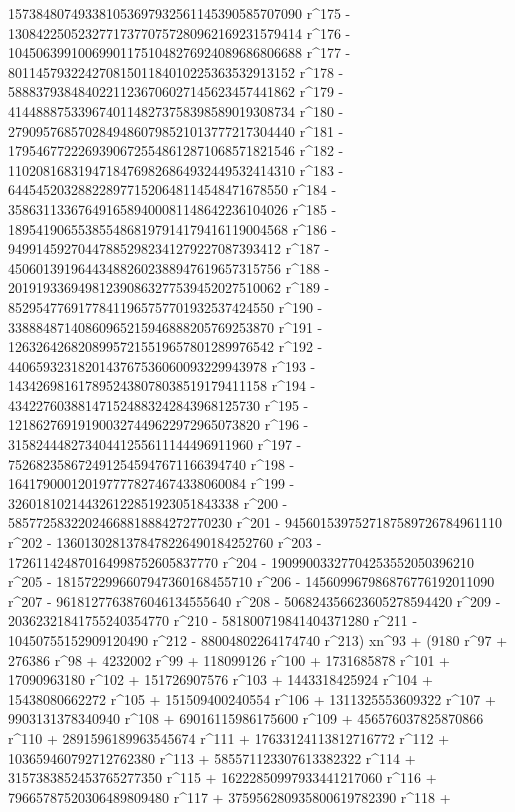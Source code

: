        157384807493381053697932561145390585707090 r^175 - 
       130842250523277173770757280962169231579414 r^176 - 
       104506399100699011751048276924089686806688 r^177 - 
       80114579322427081501184010225363532913152 r^178 - 
       58883793848402211236706027145623457441862 r^179 - 
       41448887533967401148273758398589019308734 r^180 - 
       27909576857028494860798521013777217304440 r^181 - 
       17954677222693906725548612871068571821546 r^182 - 
       11020816831947184769826864932449532414310 r^183 - 
       6445452032882289771520648114548471678550 r^184 - 
       3586311336764916589400081148642236104026 r^185 - 
       1895419065538554868197914179416119004568 r^186 - 
       949914592704478852982341279227087393412 r^187 - 
       450601391964434882602388947619657315756 r^188 - 
       201919336949812390863277539452027510062 r^189 - 
       85295477691778411965757701932537424550 r^190 - 
       33888487140860965215946888205769253870 r^191 - 
       12632642682089957215519657801289976542 r^192 - 
       4406593231820143767536060093229943978 r^193 - 
       1434269816178952438078038519179411158 r^194 - 
       434227603881471524883242843968125730 r^195 - 
       121862769191900327449622972965073820 r^196 - 
       31582444827340441255611144496911960 r^197 - 
       7526823586724912545947671166394740 r^198 - 
       1641790001201977778274674338060084 r^199 - 
       326018102144326122851923051843338 r^200 - 
       58577258322024668818884272770230 r^201 - 
       9456015397527187589726784961110 r^202 - 
       1360130281378478226490184252760 r^203 - 
       172611424870164998752605837770 r^204 - 
       19099003327704253552050396210 r^205 - 
       1815722996607947360168455710 r^206 - 
       145609967986876776192011090 r^207 - 
       9618127763876046134555640 r^208 - 
       506824356623605278594420 r^209 - 
       20362321841755240354770 r^210 - 581800719841404371280 r^211 - 
       10450755152909120490 r^212 - 
       88004802264174740 r^213) xn^93 + (9180 r^97 + 276386 r^98 + 
       4232002 r^99 + 118099126 r^100 + 1731685878 r^101 + 
       17090963180 r^102 + 151726907576 r^103 + 1443318425924 r^104 + 
       15438080662272 r^105 + 151509400240554 r^106 + 
       1311325553609322 r^107 + 9903131378340940 r^108 + 
       69016115986175600 r^109 + 456576037825870866 r^110 + 
       2891596189963545674 r^111 + 17633124113812716772 r^112 + 
       103659460792712762380 r^113 + 585571123307613382322 r^114 + 
       3157383852453765277350 r^115 + 16222850997933441217060 r^116 + 
       79665787520306489809480 r^117 + 
       375956280935800619782390 r^118 + 
